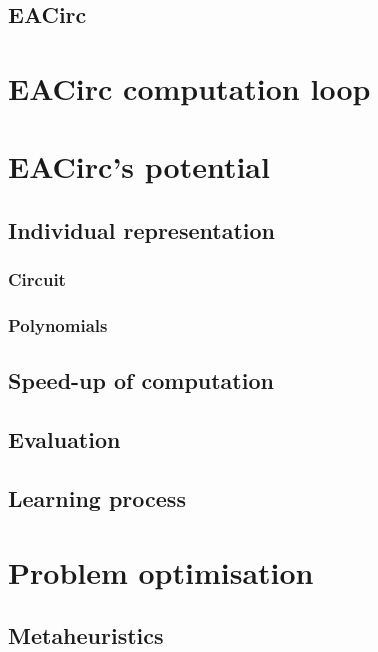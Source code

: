 \documentclass[
  print, %
  Table,   %
  nolof,     %
  nolot,     %
  11pt, %
  oneside  %
]{fithesis3}
\begin{document}
\subsection{EACirc}
\label{subsec:eacirc}

\section{EACirc computation loop}
\label{sec:eac-comp}

\section{EACirc's potential}
\label{sec:eac-potential}

\subsection{Individual representation}
\label{subsec:eac-indiv-repres}

\subsubsection{Circuit}
\label{subsubsec:eac-indiv-repres-circuit}

\subsubsection{Polynomials}
\label{subsubsec:eac-indiv-repres-poly}

\subsection{Speed-up of computation}
\label{subsec:eac-speedup}

\subsection{Evaluation}
\label{subsec:eac-eval}

\subsection{Learning process}
\label{subsec:eac-learning}

\section{Problem optimisation}
\label{sec:prob-opt}

\subsection{Metaheuristics}
\label{subsec:prob-opt-meta}
\end{document}
